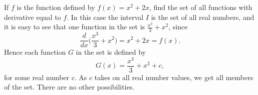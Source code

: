 \begin{example}
\label{examp 2.5.1}
If $f$ is the function defined by $f(x) = x^2 + 2x$, find the set of all functions with derivative equal to $f$. In this case the interval $I$ is the set of all real numbers, and it is easy to see that one function in the set is $\frac{x^3}{3} + x^2$, since
$$
\frac{d}{dx} \bigl( \frac{x^3}{3} + x^2 \bigr) = x^2 + 2x = f(x).
$$
\noindent Hence each function $G$ in the set is defined by
$$
G(x) = \frac{x^3}{3} + x^2 + c,
$$
\noindent for some real number $c$. As $c$ takes on all real number values, we get all members of the set. There are no other possibilities.
\end{example}


